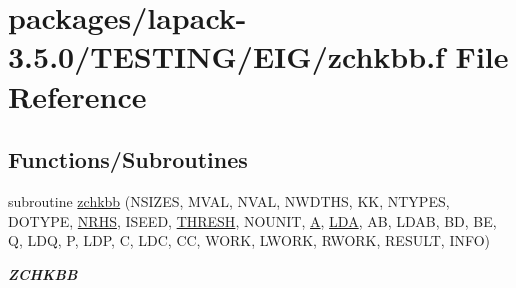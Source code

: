 \hypertarget{zchkbb_8f}{}\section{packages/lapack-\/3.5.0/\+T\+E\+S\+T\+I\+N\+G/\+E\+I\+G/zchkbb.f File Reference}
\label{zchkbb_8f}
\subsection*{Functions/\+Subroutines}
\begin{DoxyCompactItemize}
\item 
subroutine \hyperlink{group__complex16__eig_gae5f31f8b72cd1f618622fe93c6b9eac1}{zchkbb} (N\+S\+I\+Z\+E\+S, M\+V\+A\+L, N\+V\+A\+L, N\+W\+D\+T\+H\+S, K\+K, N\+T\+Y\+P\+E\+S, D\+O\+T\+Y\+P\+E, \hyperlink{example__user_8c_aa0138da002ce2a90360df2f521eb3198}{N\+R\+H\+S}, I\+S\+E\+E\+D, \hyperlink{zlaqgs_8c_a0656018abfc9fa2821827415f5d5ea57}{T\+H\+R\+E\+S\+H}, N\+O\+U\+N\+I\+T, \hyperlink{classA}{A}, \hyperlink{example__user_8c_ae946da542ce0db94dced19b2ecefd1aa}{L\+D\+A}, A\+B, L\+D\+A\+B, B\+D, B\+E, Q, L\+D\+Q, P, L\+D\+P, C, L\+D\+C, C\+C, W\+O\+R\+K, L\+W\+O\+R\+K, R\+W\+O\+R\+K, R\+E\+S\+U\+L\+T, I\+N\+F\+O)
\begin{DoxyCompactList}\small\item\em {\bfseries Z\+C\+H\+K\+B\+B} \end{DoxyCompactList}\end{DoxyCompactItemize}
